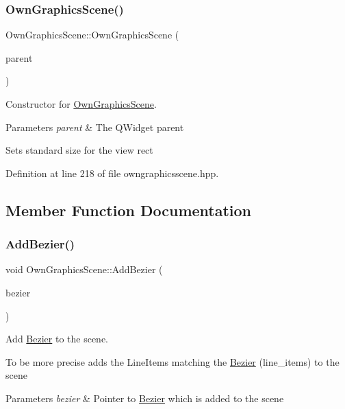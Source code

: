 \subsubsection{\texorpdfstring{Own\+Graphics\+Scene()}{OwnGraphicsScene()}}
{\footnotesize\ttfamily Own\+Graphics\+Scene\+::\+Own\+Graphics\+Scene (\begin{DoxyParamCaption}\item[{Q\+Widget $\ast$}]{parent }\end{DoxyParamCaption})\hspace{0.3cm}{\ttfamily [inline]}}



Constructor for \mbox{\hyperlink{classOwnGraphicsScene}{Own\+Graphics\+Scene}}. 


\begin{DoxyParams}{Parameters}
{\em parent} & The Q\+Widget parent\\
\hline
\end{DoxyParams}
Sets standard size for the view rect 

Definition at line 218 of file owngraphicsscene.\+hpp.



\subsection{Member Function Documentation}
\mbox{\label{classOwnGraphicsScene_ac0c5440d16675d6bf8c27767d2721622}} 
\subsubsection{\texorpdfstring{Add\+Bezier()}{AddBezier()}}
{\footnotesize\ttfamily void Own\+Graphics\+Scene\+::\+Add\+Bezier (\begin{DoxyParamCaption}\item[{\mbox{\hyperlink{classBezier}{Bezier}} $\ast$}]{bezier }\end{DoxyParamCaption})}



Add \mbox{\hyperlink{classBezier}{Bezier}} to the scene. 

To be more precise adds the Line\+Items matching the \mbox{\hyperlink{classBezier}{Bezier}} (line\+\_\+items) to the scene 
\begin{DoxyParams}{Parameters}
{\em bezier} & Pointer to \mbox{\hyperlink{classBezier}{Bezier}} which is added to the scene \\
\hline
\end{DoxyParams}


